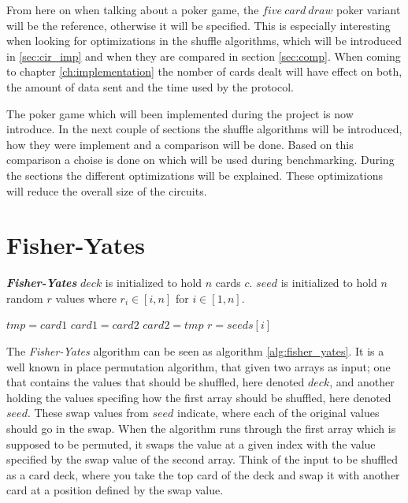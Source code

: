 \documentclass[twoside,11pt,openright]{report}
\newcommand{\FY}{\textit{Fisher-Yates} }
\begin{document}
From here on when talking about a poker game, the $five~card~draw$ poker variant will be the reference, otherwise it will be specified. This is especially interesting when looking for optimizations in the shuffle algorithms, which will be introduced in \ref{sec:cir_imp} and when they are compared in section \ref{sec:comp}. When coming to chapter \ref{ch:implementation} the nomber of cards dealt will have effect on both, the amount of data sent and the time used by the protocol.

\bigskip

The poker game which will been implemented during the project is now introduce. In the next couple of sections the shuffle algorithms will be introduced, how they were implement and a comparison will be done. Based on this comparison a choise is done on which will be used during benchmarking. During the sections the different optimizations will be explained. These optimizations will reduce the overall size of the circuits.


\section{Fisher-Yates}
\label{sec:fisher-yates}

\begin{algorithm}[t]
\caption{\textbf{\textit{Fisher-Yates}} \newline
    $deck$ is initialized to hold $n$ cards $c$. \newline
    $seed$ is initialized to hold $n$ random $r$ values where $r_i\in[i,n]$ for $i\in [1,n]$.
}
\label{alg:fisher_yates}

\begin{algorithmic}[t]
\State $tmp = card1$
\State $card1 = card2$
\State $card2 = tmp$
\EndFunction
\State
{}
\State $r = seeds[i]$
\State {}
\EndFor
\EndFunction
\end{algorithmic}
\end{algorithm}

The \FY algorithm can be seen as algorithm \ref{alg:fisher_yates}. It is a well known in place permutation algorithm, that given two arrays as input; one that contains the values that should be shuffled, here denoted $deck$, and another holding the values specifing how the first array should be shuffled, here denoted $seed$. These swap values from $seed$ indicate, where each of the original values should go in the swap. When the algorithm runs through the first array which is supposed to be permuted, it swaps the value at a given index with the value specified by the swap value of the second array. Think of the input to be shuffled as a card deck, where you take the top card of the deck and swap it with another card at a position defined by the swap value.
\end{document}
